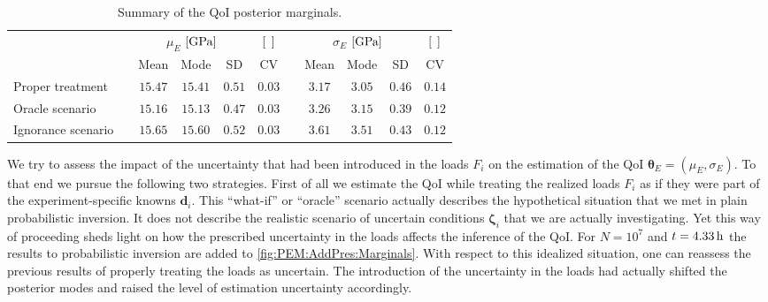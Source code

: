 \begin{table}[ht]
  \caption[Summary of the QoI posterior marginals]{Summary of the QoI posterior marginals.}
  \label{tab:PEM:AddPres:Summary}
  \centering
  \begin{tabular}{lcccccccccc}
    \toprule
      & \phantom{} & \multicolumn{3}{c}{\(\mu_E\) \(\lbrack\unit[]{GPa}\rbrack\)} & \(\lbrack \;\, \rbrack\)
      & \phantom{} & \multicolumn{3}{c}{\(\sigma_E\) \(\lbrack\unit[]{GPa}\rbrack\)} & \(\lbrack \;\, \rbrack\) \\
    \cmidrule{3-6} \cmidrule{8-11}
    && Mean & Mode & SD & CV && Mean & Mode & SD & CV \\
    \midrule
    Proper treatment   && \(15.47\) & \(15.41\) & \(0.51\) & \(0.03\) && \(3.17\) & \(3.05\) & \(0.46\) & \(0.14\) \\
    Oracle scenario    && \(15.16\) & \(15.13\) & \(0.47\) & \(0.03\) && \(3.26\) & \(3.15\) & \(0.39\) & \(0.12\) \\
    Ignorance scenario && \(15.65\) & \(15.60\) & \(0.52\) & \(0.03\) && \(3.61\) & \(3.51\) & \(0.43\) & \(0.12\) \\
    \bottomrule
  \end{tabular}
\end{table}
\par %
We try to assess the impact of the uncertainty that had been introduced in the loads \(F_i\) on the estimation of the QoI \(\bm{\theta}_E = (\mu_E,\sigma_E)\).
To that end we pursue the following two strategies.
First of all we estimate the QoI while treating the realized loads \(F_i\) as if they were part of the experiment-specific knowns \(\bm{d}_i\).
This ``what-if'' or ``oracle'' scenario actually describes the hypothetical situation that we met in plain probabilistic inversion.
It does not describe the realistic scenario of uncertain conditions \(\bm{\zeta}_i\) that we are actually investigating.
Yet this way of proceeding sheds light on how the prescribed uncertainty in the loads affects the inference of the QoI.
For \(N=10^7\) and \(t=\unit[4.33]{h}\) the results to probabilistic inversion are added to \cref{fig:PEM:AddPres:Marginals}.
With respect to this idealized situation, one can reassess the previous results of properly treating the loads as uncertain.
The introduction of the uncertainty in the loads had actually shifted the posterior modes and raised the level of estimation uncertainty accordingly.
\par %
